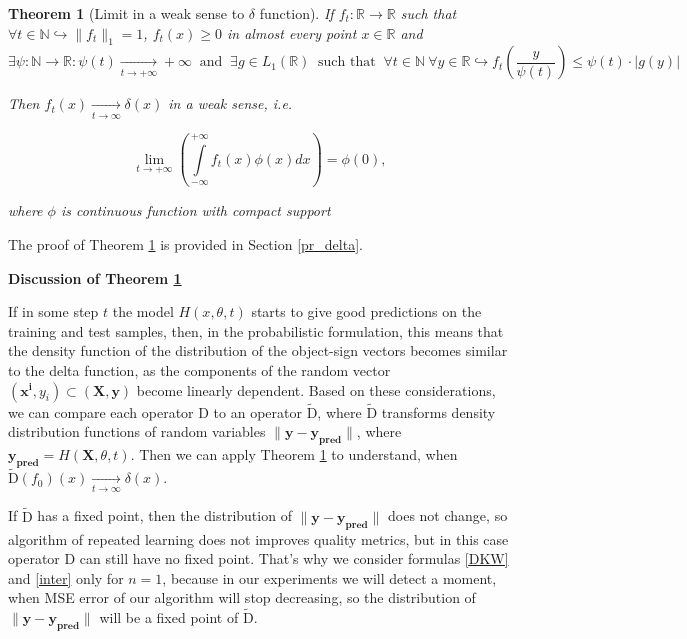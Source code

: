 \documentclass{article}
\newtheorem{theorem}{Theorem}
\begin{document}
    \begin{theorem}[Limit in a weak sense to $\delta$ function] \label{delta}
        If $f_t : \mathbb{R} \to \mathbb{R}$ such that $\forall t \in \mathbb{N} \hookrightarrow  \|f_t\|_1 = 1$, $f_t(x) \geq 0$ in almost every point $x \in \mathbb{R}$ and
        \begin{equation} \label{psi_and_g}
            \exists \psi : \mathbb{N} \to \mathbb{R} : \psi(t) \underset{t \to +\infty}{\longrightarrow} +\infty ~\text{ and }~
            \exists g \in L_1(\mathbb{R}) ~\text{ such that }~ \forall t \in \mathbb{N} ~\forall y \in \mathbb{R} \hookrightarrow f_t\left(\dfrac{y}{\psi(t)}\right) \leq \psi(t) \cdot |g(y)|
        \end{equation}

        Then $f_t(x) \underset{t \to \infty}{\longrightarrow} \delta(x)$ in a weak sense, i.e.

        \begin{equation}
            \underset{t \to +\infty}{\lim}\left(\int\limits_{-\infty}^{+\infty} f_t(x) \phi(x) dx\right) = \phi(0),
        \end{equation}

        where $\phi$ is continuous function with compact support
    \end{theorem}

    The proof of Theorem \ref{delta} is provided in Section \ref{pr_delta}.

    \textbf{Discussion of Theorem \ref{delta}}

    If in some step $t$ the model $H(x, \theta, t)$ starts to give good predictions on the training and test samples, then, in the probabilistic formulation, this means that the density function of the distribution of the object-sign vectors becomes similar to the delta function, as the components of the random vector $(\mathbf{x^i}, y_i) \subset (\mathbf{X}, \mathbf{y})$ become linearly dependent. Based on these considerations, we can compare each operator $\text{D}$ to an operator $\widetilde{\text{D}}$, where $\widetilde{\text{D}}$ transforms density distribution functions of random variables $\|\mathbf{y} - \mathbf{y_{\text{pred}}}\|$, where $\mathbf{y_{\text{pred}}} = H(\mathbf{X}, \theta, t)$. Then we can apply Theorem \ref{delta} to understand, when $\widetilde{\text{D}}(f_0)(x) \underset{t \to \infty}{\longrightarrow} \delta(x)$. 

    If $\widetilde{\text{D}}$ has a fixed point, then the distribution of $\|\mathbf{y} - \mathbf{y_{\text{pred}}}\|$ does not change, so algorithm of repeated learning does not improves quality metrics, but in this case operator $\text{D}$ can still have no fixed point. That's why we consider formulas \eqref{DKW} and \eqref{inter} only for $n=1$, because in our experiments we will detect a moment, when MSE error of our algorithm will stop decreasing, so the distribution of $\|\mathbf{y} - \mathbf{y_{\text{pred}}}\|$ will be a fixed point of $\widetilde{\text{D}}$.
\end{document}
